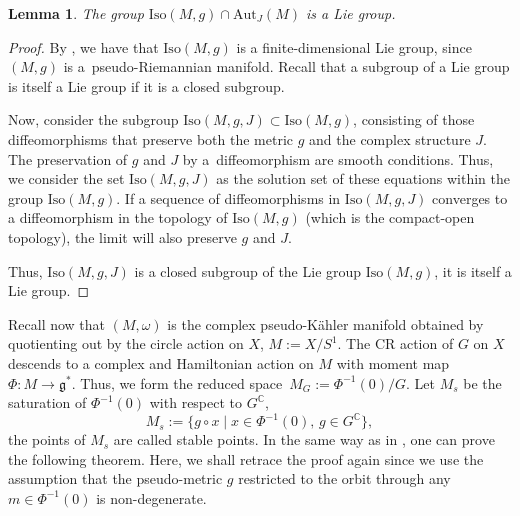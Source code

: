 \documentclass[pdftex]{sigma}
\numberwithin{equation}{section}
\newtheorem{Lemma}[Theorem]{Lemma}
\begin{document}
 	\begin{Lemma} \label{lem:finliegroup} The group $\mathrm{Iso}(M, g)\cap \mathrm{Aut}_J(M)$ is a Lie group.
 	\end{Lemma}
 	\begin{proof}
 		By \cite{k,ph}, we have that $\mathrm{Iso}(M, g)$ is a finite-dimensional Lie group, since $(M, g)$ is a~pseudo-Riemannian manifold. Recall that	a subgroup of a Lie group is itself a Lie group if it is a closed subgroup.
 		
 		Now, consider the subgroup $\mathrm{Iso}(M, g, J)\subset \mathrm{Iso}(M, g)$, consisting of those diffeomorphisms that preserve both the metric
 		$g$ and the complex structure $J$. The preservation of $g$ and	$J$ by a~diffeomorphism are smooth conditions. Thus, we consider the set $\mathrm{Iso}(M, g, J)$ as the solution set of these equations within the group $\mathrm{Iso}(M, g)$. If a sequence of diffeomorphisms in $\mathrm{Iso}(M, g, J)$ converges to a diffeomorphism in the topology of
 		$\mathrm{Iso}(M, g)$ (which is the compact-open topology), the limit will also preserve $g$ and
 		$J$.
 		
 		Thus, $\mathrm{Iso}(M, g, J)$ is a closed subgroup of the Lie group $\mathrm{Iso}(M, g)$, it is itself a Lie group.
 	\end{proof}

 	Recall now that $(M, \omega)$ is the complex pseudo-K\"ahler manifold obtained by quotienting out by the circle action on $X$, $M:=X/S^1$. The CR action of $G$ on $X$ descends to a complex and Hamiltonian action on $M$ with moment map $\Phi \colon M\rightarrow \mathfrak{g}^*$. Thus, we form the reduced space~${M_G:= \Phi^{-1}(0)/G}$.
 	Let $M_s$ be the saturation of $\Phi^{-1}(0)$ with respect to $G^{\mathbb{C}}$,
 	\[M_s:=\big\{g\circ x \mid x\in \Phi^{-1}(0),\, g\in G^{\mathbb{C}} \big\} , \]
 	the points of $M_s$ are called stable points. In the same way as in \cite[Theorem~4.5]{gs}, one can prove the following theorem. Here, we shall retrace the proof again since we use the assumption that the pseudo-metric $g$ restricted to the orbit through any $m\in \Phi^{-1}(0)$ is non-degenerate.
 	
\end{document}
